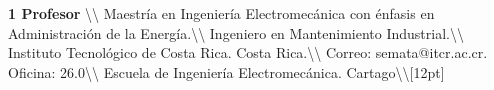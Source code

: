 \documentclass[letterpaper]{article}%
\begin{document}
\begin{tcolorbox}[
blanker,
width=0.78\textwidth,enlarge left by=0.24\textwidth,
before skip=6pt,
breakable,
overlay unbroken and first={%
    \node[inner sep=0pt,outer sep=0pt,text width=0.22\textwidth,
    align=none,
    below right]
    at ([xshift=-0.24\textwidth]frame.north west)
{
\hspace*{0mm}\fontsize{12}{14}\selectfont \textbf{\textcolor{parte}{7 Bibliografía}}
};}]

\nocite{hernandez2013dibujo}
\nocite{lieu2011dibujo}
\nocite{bogoliubov1988dibujo}
\nocite{bogoliubov1989tareas}
\printbibliography[heading=none] 
\end{tcolorbox}
%
\vspace*{10mm}%
\par\hspace*{4mm}\fontsize{12}{20}\selectfont \textbf{\textcolor{parte}{1 Profesor}}%
\newline%
\textbackslash{}\textbackslash{}\newline%
Maestría en Ingeniería Electromecánica con énfasis en Administración de la Energía.\textbackslash{}\textbackslash{}\newline%
Ingeniero en Mantenimiento Industrial.\textbackslash{}\textbackslash{}\newline%
Instituto Tecnológico de Costa Rica. Costa Rica.\textbackslash{}\textbackslash{}\newline%
Correo: semata@itcr.ac.cr. Oficina: 26.0\textbackslash{}\textbackslash{}\newline%
Escuela de Ingeniería Electromecánica. Cartago\textbackslash{}\textbackslash{}{[}12pt{]}\newline%
%
\end{document}

